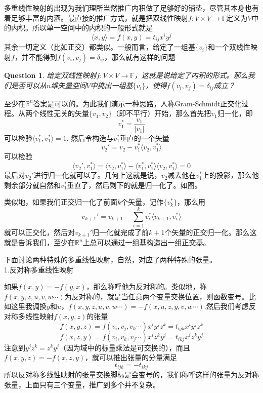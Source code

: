 \documentclass[11pt,a4paper,openany]{book}%
\theoremstyle{plain}%
\newtheorem{que}{Question}[chapter]%
\begin{document}
多重线性映射的出现为我们理所当然推广内积做了足够好的铺垫，尽管其本身也有着足够丰富的内涵。最直接的推广方式，就是把双线性映射$f:V\times V\rightarrow \mathbb{F}$定义为$V$中的内积。所以单一空间中的内积的一般形式就是
\[
\langle x, y \rangle=f(x,y)=t_{ij}x^iy^j
\]
其余一切定义（比如正交）都类似。一般而言，给定了一组基$\{v_i\}$和一个双线性映射$f$，并不能得到$f(v_i,v_j)=\delta_{ij}$，那么就有这样的问题
\begin{que}
给定双线性映射$f:V\times V\rightarrow \mathbb{F}$，这就是说给定了内积的形式。那么我们是否可以从$n$维矢量空间$V$中挑出一组基$\{v_i\}$，使得$f(v_i,v_j)=\delta_{ij}$成立？
\end{que}
至少在$\mathbb{R}^n$答案是可以的。为此我们演示一种思路，人称Gram-Schmidt正交化过程。从两个线性无关的矢量$\{v_1,v_2\}$（即不平行）开始，那么首先把$v_1$归一化，即
\[
v_1^*=\frac{v_1}{|v_1|}
\]
可以检验$\langle v_1^*, v_1^* \rangle=1$.
然后令构造与$v_1^*$垂直的一个矢量
\[
v_2'=v_2-v_1^*\langle v_2, v_1^* \rangle 
\]
可以检验
\[
\langle v_2', v_1^* \rangle=\langle v_2, v_1^* \rangle-\langle v_1^*, v_1^* \rangle\langle v_2, v_1^* \rangle =0
\]
最后对$v_2'$进行归一化就可以了。几何上这就是说，$v_2$减去他在$v_1^*$上的投影，那么他剩余部分就自然和$v_1^*$垂直了，然后剩下的就是归一化了。如图。\\
\begin{center}
\end{center}
类似地，如果我们正交归一化了前面$k$个矢量，记作$\{v_k^*\}$，那么用
\[
v_{k+1}'=v_{k+1}-\sum_{i=1}^kv_i^* \langle v_{k+1}, v_i^* \rangle 
\]
就可以正交化，然后对$v_{k+1}'$归一化就完成了前$k+1$个矢量的正交归一化。那么这就是告诉我们，至少在$\mathbb{R}^n$上总可以通过一组基构造出一组正交基。

下面讨论两种特殊的多重线性映射，自然，对应了两种特殊的张量。\\
\noindent 1.反对称多重线性映射

如果$f(x,y)=-f(y,x)$，那么称呼他为{\kaishu 反对称}的。类似地，称$f(x,y,z,u,v,w\cdots)$为反对称的，就是当任意两个变量交换位置，则函数变号。比如这里我调换$y$和$u$，$f(x,y,z,u,v,w\cdots)=-f(x,u,z,y,v,w\cdots)$.然后我们考虑反对称多线性映射$f(x,y,z)$的张量
\[
f(x,y,z)=f(v_i,v_j,v_k\cdots)x^iy^jz^k=t_{ijk}x^iy^jz^k
\]
\[
f(x,z,y)=f(v_i,v_k,v_j\cdots)x^iz^ky^j=t_{ikj}x^iz^ky^j
\]
注意到$y^jz^k=z^ky^j$（因为域中的标量乘法是可交换的），而且$f(x,y,z)=-f(x,z,y)$，就可以推出张量的分量满足
\[
t_{ijk}=-t_{ikj}
\]
所以反对称多线性映射的张量交换脚标是会变号的，我们称呼这样的张量为反对称张量，上面只有三个变量，推广到多个并不复杂。
\end{document}

